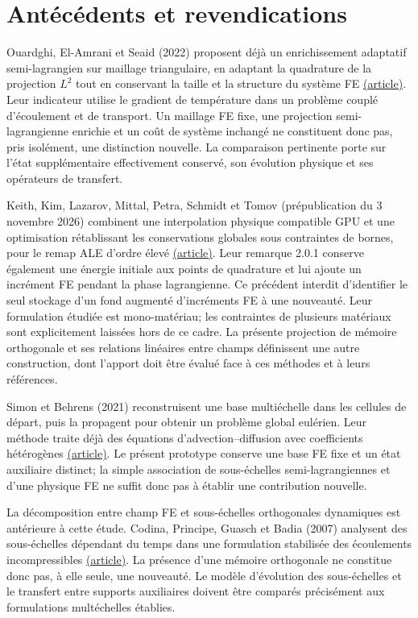 \documentclass[11pt,a4paper]{article}
\begin{document}
\section{Antécédents et revendications}
Ouardghi, El-Amrani et Seaid (2022) proposent déjà un enrichissement
adaptatif semi-lagrangien sur maillage triangulaire, en adaptant la
quadrature de la projection $L^2$ tout en conservant la taille et la
structure du système FE
\href{https://doi.org/10.1016/j.compfluid.2022.105474}{(article)}.
Leur indicateur utilise le gradient de température dans un problème
couplé d'écoulement et de transport. Un maillage FE fixe, une projection
semi-lagrangienne enrichie et un coût de système inchangé ne constituent
donc pas, pris isolément, une distinction nouvelle. La comparaison
pertinente porte sur l'état supplémentaire effectivement conservé,
son évolution physique et ses opérateurs de transfert.

Keith, Kim, Lazarov, Mittal, Petra, Schmidt et Tomov (prépublication du
3 novembre 2026) combinent une interpolation physique compatible GPU
et une optimisation rétablissant les conservations globales sous
contraintes de bornes, pour le remap ALE d'ordre élevé
\href{https://arxiv.org/html/2611.05327v1}{(article)}.
Leur remarque 2.0.1 conserve également une énergie initiale aux points
de quadrature et lui ajoute un incrément FE pendant la phase lagrangienne.
Ce précédent interdit d'identifier le seul stockage d'un fond augmenté
d'incréments FE à une nouveauté. Leur formulation étudiée est
mono-matériau; les contraintes de plusieurs matériaux sont explicitement
laissées hors de ce cadre. La présente projection de mémoire orthogonale
et ses relations linéaires entre champs définissent une autre construction,
dont l'apport doit être évalué face à ces méthodes et à leurs références.

Simon et Behrens (2021) reconstruisent une base multiéchelle dans les
cellules de départ, puis la propagent pour obtenir un problème global
eulérien. Leur méthode traite déjà des équations d'advection--diffusion
avec coefficients hétérogènes
\href{https://doi.org/10.1007/s10915-021-01451-w}{(article)}.
Le présent prototype conserve une base FE fixe et un état auxiliaire
distinct; la simple association de sous-échelles semi-lagrangiennes et
d'une physique FE ne suffit donc pas à établir une contribution nouvelle.

La décomposition entre champ FE et sous-échelles orthogonales dynamiques
est antérieure à cette étude. Codina, Principe, Guasch et Badia (2007)
analysent des sous-échelles dépendant du temps dans une formulation
stabilisée des écoulements incompressibles
\href{https://doi.org/10.1016/j.cma.2007.01.002}{(article)}.
La présence d'une mémoire orthogonale ne constitue donc pas, à elle
seule, une nouveauté. Le modèle d'évolution des sous-échelles et le
transfert entre supports auxiliaires doivent être comparés précisément
aux formulations multéchelles établies.
\end{document}
